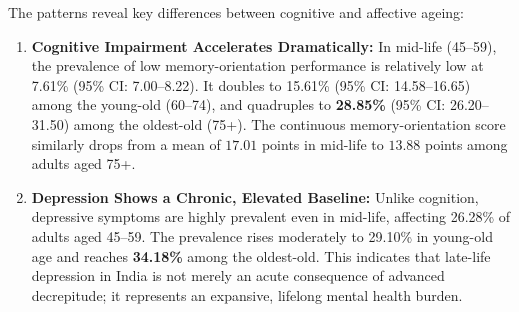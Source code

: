 The patterns reveal key differences between cognitive and affective ageing:
\begin{enumerate}
    \item \textbf{Cognitive Impairment Accelerates Dramatically:} In mid-life (45--59), the prevalence of low memory-orientation performance is relatively low at 7.61\% (95\% CI: 7.00--8.22). It doubles to 15.61\% (95\% CI: 14.58--16.65) among the young-old (60--74), and quadruples to \textbf{28.85\%} (95\% CI: 26.20--31.50) among the oldest-old (75+). The continuous memory-orientation score similarly drops from a mean of $17.01$ points in mid-life to $13.88$ points among adults aged 75+.
    \item \textbf{Depression Shows a Chronic, Elevated Baseline:} Unlike cognition, depressive symptoms are highly prevalent even in mid-life, affecting 26.28\% of adults aged 45--59. The prevalence rises moderately to 29.10\% in young-old age and reaches \textbf{34.18\%} among the oldest-old. This indicates that late-life depression in India is not merely an acute consequence of advanced decrepitude; it represents an expansive, lifelong mental health burden.
\end{enumerate}


